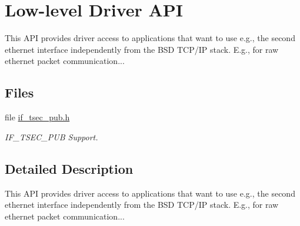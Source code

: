 \hypertarget{group__powerpc__iftsecpub}{}\section{Low-\/level Driver A\+PI}
\label{group__powerpc__iftsecpub}


This A\+PI provides driver access to applications that want to use e.\+g., the second ethernet interface independently from the B\+SD T\+C\+P/\+IP stack. E.\+g., for raw ethernet packet communication...  


\subsection*{Files}
\begin{DoxyCompactItemize}
\item 
file \mbox{\hyperlink{if__tsec__pub_8h}{if\+\_\+tsec\+\_\+pub.\+h}}
\begin{DoxyCompactList}\small\item\em I\+F\+\_\+\+T\+S\+E\+C\+\_\+\+P\+UB Support. \end{DoxyCompactList}\end{DoxyCompactItemize}


\subsection{Detailed Description}
This A\+PI provides driver access to applications that want to use e.\+g., the second ethernet interface independently from the B\+SD T\+C\+P/\+IP stack. E.\+g., for raw ethernet packet communication... 


